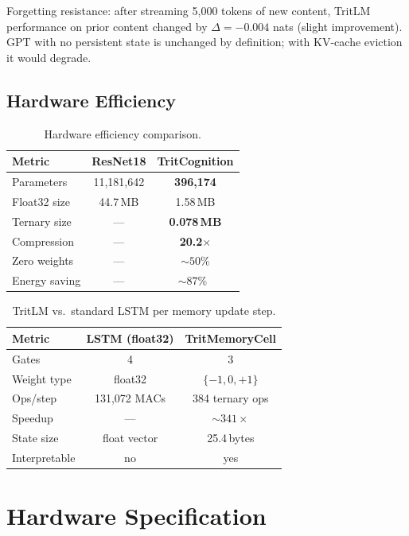 \documentclass[10pt,twocolumn]{article}
\newcommand{\tritnet}{TritCognition}
\newcommand{\tritlm}{TritLM}
\begin{document}
Forgetting resistance: after streaming 5,000 tokens of new content,
\tritlm{} performance on prior content changed by $\Delta{=}{-}0.004$
nats (slight improvement). GPT with no persistent state is unchanged
by definition; with KV-cache eviction it would degrade.

\subsection{Hardware Efficiency}

\begin{table}[H]
\centering\small
\caption{Hardware efficiency comparison.}
\begin{tabular}{lcc}
\toprule
Metric & ResNet18 & \tritnet{} \\ \midrule
Parameters      & 11,181,642 & \textbf{396,174} \\
Float32 size    & 44.7\,MB    & 1.58\,MB \\
Ternary size    & ---         & \textbf{0.078\,MB} \\
Compression     & ---         & \textbf{20.2$\times$} \\
Zero weights    & ---         & ${\sim}50\%$ \\
Energy saving   & ---         & ${\sim}87\%$~\cite{andri2018} \\
\bottomrule
\end{tabular}
\end{table}

\begin{table}[H]
\centering\small
\caption{\tritlm{} vs.\ standard LSTM per memory update step.}
\begin{tabular}{lcc}
\toprule
Metric & LSTM (float32) & TritMemoryCell \\ \midrule
Gates         & 4              & 3 \\
Weight type   & float32        & $\{-1,0,+1\}$ \\
Ops/step      & 131,072 MACs   & 384 ternary ops \\
Speedup       & ---            & ${\sim}341\times$ \\
State size    & float vector   & 25.4\,bytes \\
Interpretable & no             & yes \\
\bottomrule
\end{tabular}
\end{table}

\section{Hardware Specification}
\end{document}
